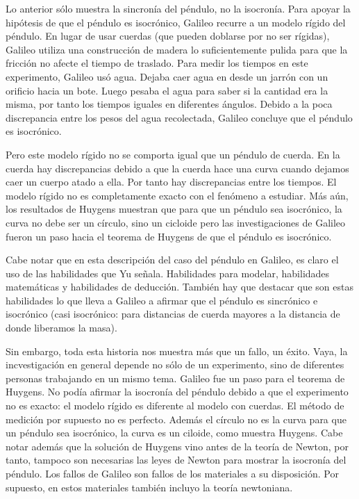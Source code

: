 Lo anterior sólo muestra la sincronía del péndulo, no la isocronía. Para apoyar la hipótesis de que el péndulo es isocrónico, Galileo recurre a un modelo rígido del péndulo. En lugar de usar cuerdas (que pueden doblarse por no ser rígidas), Galileo utiliza una construcción de madera lo suficientemente pulida para que la fricción no afecte el tiempo de traslado. Para medir los tiempos en este experimento, Galileo usó agua. Dejaba caer agua en desde un jarrón con un orificio hacia un bote. Luego pesaba el agua para saber si la cantidad era la misma, por tanto los tiempos iguales en diferentes ángulos. Debido a la poca discrepancia entre los pesos del agua recolectada, Galileo concluye que el péndulo es isocrónico.

Pero este modelo rígido no se comporta igual que un péndulo de cuerda. En la cuerda hay discrepancias debido a que la cuerda hace una curva cuando dejamos caer un cuerpo atado a ella. Por tanto hay discrepancias entre los tiempos. El modelo rígido no es completamente exacto con el fenómeno a estudiar. Más aún, los resultados de Huygens muestran que para que un péndulo sea isocrónico, la curva no debe ser un círculo, sino un cicloide \cite{ramond2023} pero las investigaciones de Galileo fueron un paso hacia el teorema de Huygens de que el péndulo es isocrónico. 

Cabe notar que en esta descripción del caso del péndulo en Galileo, es claro el uso de las habilidades que Yu señala. Habilidades para modelar, habilidades matemáticas y habilidades de deducción. También hay que destacar que son estas habilidades lo que lleva a Galileo a afirmar que el péndulo es sincrónico e isocrónico (casi isocrónico: para distancias de cuerda mayores a la distancia de donde liberamos la masa). 

Sin embargo, toda esta historia nos muestra más que un fallo, un éxito. Vaya, la incvestigación en general depende no sólo de un experimento, sino de diferentes personas trabajando en un mismo tema. Galileo fue un paso para el teorema de Huygens. No podía afirmar la isocronía del péndulo debido a que el experimento no es exacto: el modelo rígido es diferente al modelo con cuerdas. El método de medición por supuesto no es perfecto. Además el círculo no es la curva para que un péndulo sea isocrónico, la curva es un ciloide, como muestra Huygens. Cabe notar además que la solución de Huygens vino antes de la teoría de Newton, por tanto, tampoco son necesarias las leyes de Newton para mostrar la isocronía del péndulo. Los fallos de Galileo son fallos de los materiales a su disposición. Por supuesto, en estos materiales también incluyo la teoría newtoniana.

